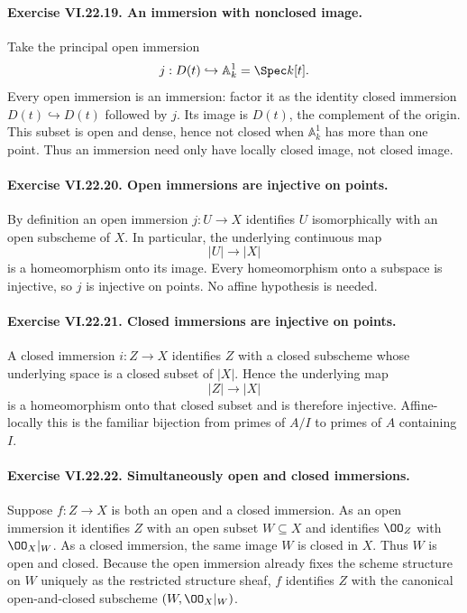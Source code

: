 \paragraph{Exercise VI.22.19. An immersion with nonclosed image.}
\begin{solution}
Take the principal open immersion
\[
 j:D(t)\hookrightarrow\mathbb A^1_k=\Spec k[t].
\]
Every open immersion is an immersion: factor it as the identity closed immersion
$D(t)\hookrightarrow D(t)$ followed by $j$.  Its image is $D(t)$, the complement of the
origin.  This subset is open and dense, hence not closed when $\mathbb A^1_k$ has more than one
point.  Thus an immersion need only have locally closed image, not closed image.
\end{solution}

\paragraph{Exercise VI.22.20. Open immersions are injective on points.}
\begin{solution}
By definition an open immersion $j:U\to X$ identifies $U$ isomorphically with an open
subscheme of $X$.  In particular, the underlying continuous map
\[
 |U|\longrightarrow|X|
\]
is a homeomorphism onto its image.  Every homeomorphism onto a subspace is injective, so $j$
is injective on points.  No affine hypothesis is needed.
\end{solution}

\paragraph{Exercise VI.22.21. Closed immersions are injective on points.}
\begin{solution}
A closed immersion $i:Z\to X$ identifies $Z$ with a closed subscheme whose underlying space is
a closed subset of $|X|$.  Hence the underlying map
\[
 |Z|\longrightarrow|X|
\]
is a homeomorphism onto that closed subset and is therefore injective.  Affine-locally this is
the familiar bijection from primes of $A/I$ to primes of $A$ containing $I$.
\end{solution}

\paragraph{Exercise VI.22.22. Simultaneously open and closed immersions.}
\begin{solution}
Suppose $f:Z\to X$ is both an open and a closed immersion.  As an open immersion it identifies
$Z$ with an open subset $W\subseteq X$ and identifies $\OO_Z$ with $\OO_X|_W$.  As a closed
immersion, the same image $W$ is closed in $X$.  Thus $W$ is open and closed.  Because the open
immersion already fixes the scheme structure on $W$ uniquely as the restricted structure sheaf,
$f$ identifies $Z$ with the canonical open-and-closed subscheme $(W,\OO_X|_W)$.
\end{solution}

